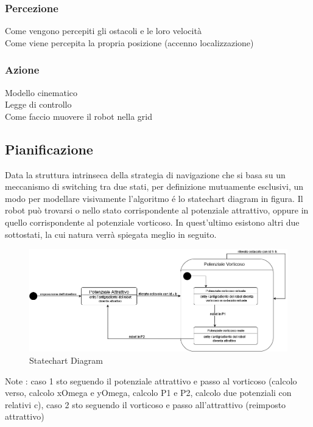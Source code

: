 \documentclass[14pt,twoside,a4paper]{extarticle}
\begin{document}
\subsubsection{Percezione}
Come vengono percepiti gli ostacoli e le loro velocità\\
Come viene percepita la propria posizione (accenno localizzazione)\\
\subsubsection{Azione}
Modello cinematico\\
Legge di controllo\\
Come faccio muovere il robot nella grid

\subsection{Pianificazione}
Data la struttura intrinseca della strategia di navigazione che si basa su un meccanismo di switching tra due stati, per definizione mutuamente esclusivi, un modo per modellare visivamente l'algoritmo é lo statechart diagram in figura. Il robot può trovarsi o nello stato corrispondente al potenziale attrattivo, oppure in quello corrispondente al potenziale vorticoso. In quest'ultimo esistono altri due sottostati, la cui natura verrà spiegata meglio in seguito.
	
\begin{figure}[H]
\caption{Statechart Diagram} \label{state}
\includegraphics[width=\textwidth]{stateDiagram.png}
\end{figure}
	
Note	: caso 1 sto seguendo il potenziale attrattivo e passo al vorticoso (calcolo verso, calcolo xOmega e yOmega, calcolo P1 e P2, calcolo due potenziali con relativi c), caso 2 sto seguendo il vorticoso e passo all'attrattivo (reimposto attrattivo)
	
\end{document}
